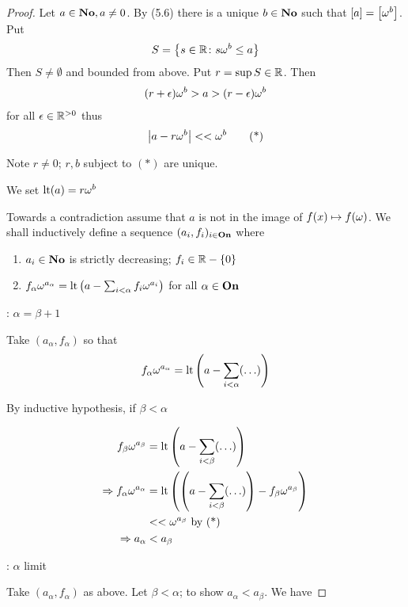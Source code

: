 \begin{proof} %

Let $a \in \mathbf{No}, a \neq 0$. By (5.6) there is a unique $b \in \mathbf{No}$ such that $\left[ a \right] = \left[ \omega^b \right]$.
Put
\begin{align*}
	S = \left\{ s \in \mathbb{R} \colon s\omega^b \leq a \right\}
\end{align*}
Then $S \neq \emptyset$ and bounded from above.
Put $r = \sup S \in \mathbb{R}$.
Then
\begin{align*}
	(r + \epsilon)\omega^b > a > (r - \epsilon)\omega^b
\end{align*}
for all $\epsilon \in \mathbb{R}^{>0}$
thus
\begin{align*}
	\left| a - r\omega^b \right| << \omega^b \tag{*}
\end{align*}

Note $r \neq 0$; $r,b$ subject to $(*)$ are unique.

We set $\operatorname{lt}(a) = r\omega^b$

Towards a contradiction assume that $a$ is not in the image of $f(x) \mapsto f(\omega)$.
We shall inductively define a sequence $(a_i, f_i)_{i \in \mathbf{On}}$ where 

\begin{enumerate}
  \item $a_i \in \mathbf{No}$ is strictly decreasing; $f_i \in \mathbb{R} - \{0\}$
  \item $f_\alpha \omega^{a_\alpha} = \operatorname{lt}\left( a - \sum_{i < \alpha} f_i\omega^{a_i} \right)$ for all $\alpha \in \mathbf{On}$
\end{enumerate}

: $\alpha = \beta + 1$

Take $(a_\alpha, f_\alpha)$ so that
\begin{align*}
	f_\alpha\omega^{a_\alpha} = \operatorname{lt}\left( a - \sum_{i < \alpha}(\ldots) \right)
\end{align*}

By inductive hypothesis, if $\beta < \alpha$

\begin{align*}
	f_\beta\omega^{a_\beta} &= \operatorname{lt}\left( a - \sum_{i < \beta}(\ldots) \right) \\
	\Rightarrow f_\alpha\omega^{a_\alpha} &= \operatorname{lt}\left( \left( a - \sum_{i < \beta}(\ldots) \right) - f_\beta\omega^{a_\beta} \right) \\
	&<< \omega^{a_\beta} \text{ by (*)} \\
	\Rightarrow a_\alpha &< a_\beta
\end{align*}

: $\alpha$ limit

Take $(a_\alpha, f_\alpha)$ as above.
Let $\beta < \alpha$; to show $a_\alpha < a_\beta$.
We have


\end{proof}
